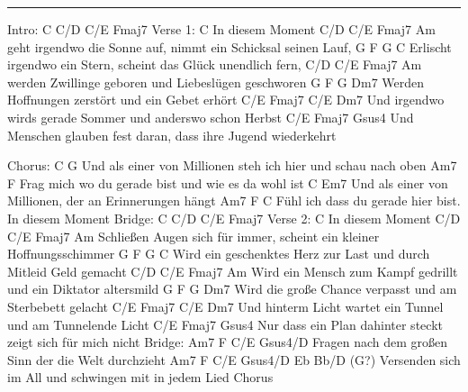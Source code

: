 \noindent\rule{\columnwidth}{1pt}

\begin{lstsong}
Intro: C  C/D  C/E  Fmaj7
Verse 1:
          C
In diesem Moment
          C/D           C/E               Fmaj7          Am
geht irgendwo die Sonne auf, nimmt ein Schicksal seinen Lauf,
            G       F                   G                C
Erlischt irgendwo ein Stern, scheint das Glück unendlich fern,
        C/D         C/E       Fmaj7           Am
werden Zwillinge geboren und Liebeslügen geschworen
       G           F           G          Dm7
Werden Hoffnungen zerstört und ein Gebet erhört
    C/E                  Fmaj7           C/E          Dm7
Und irgendwo wirds gerade Sommer und anderswo schon Herbst
                     C/E  Fmaj7            Gsus4
Und Menschen glauben fest daran, dass ihre Jugend wiederkehrt

Chorus:
        C                            G
Und als einer von Millionen steh ich hier und schau nach oben
     Am7                     F
Frag mich wo du gerade bist   und wie es da wohl ist
        C                            Em7
Und als einer von Millionen, der an Erinnerungen hängt
     Am7                            F               C
Fühl ich dass du gerade hier bist.   In diesem Moment
Bridge: C  C/D  C/E  Fmaj7
Verse 2:
            C
In diesem Moment
             C/D           C/E               Fmaj7            Am
Schließen Augen sich für immer, scheint ein kleiner Hoffnungsschimmer
            G                 F              G                C
Wird ein geschenktes Herz zur Last und durch Mitleid Geld gemacht
          C/D           C/E                 Fmaj7           Am
Wird ein Mensch zum Kampf gedrillt und ein Diktator altersmild
                G           F           G          Dm7
Wird die große Chance verpasst und am Sterbebett gelacht
            C/E                Fmaj7           C/E          Dm7
Und hinterm Licht wartet ein   Tunnel und am Tunnelende Licht
            C/E            Fmaj7            Gsus4
Nur dass ein Plan dahinter steckt zeigt sich für mich nicht
Bridge:
 Am7    F               C/E         Gsus4/D
Fragen nach dem großen Sinn der die Welt durchzieht
Am7       F                C/E         Gsus4/D           Eb  Bb/D (G?)
Versenden sich im All und schwingen mit in jedem Lied
Chorus
\end{lstsong}
\newpage
